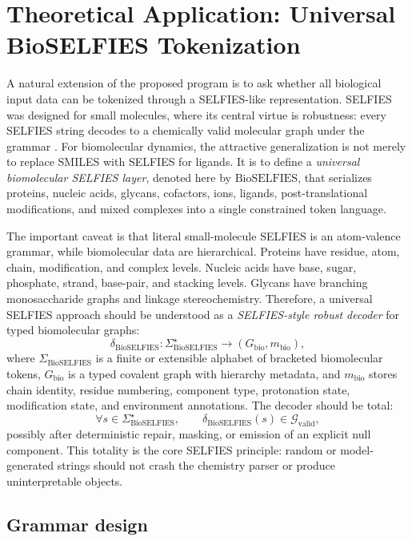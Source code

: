 \documentclass[11pt]{article}
\newcommand{\bioselfies}{\mathrm{BioSELFIES}}
\begin{document}
\section{Theoretical Application: Universal BioSELFIES Tokenization}

A natural extension of the proposed program is to ask whether all biological input data can be tokenized through a SELFIES-like representation. SELFIES was designed for small molecules, where its central virtue is robustness: every SELFIES string decodes to a chemically valid molecular graph under the grammar \cite{krenn2020selfies}. For biomolecular dynamics, the attractive generalization is not merely to replace SMILES with SELFIES for ligands. It is to define a \emph{universal biomolecular SELFIES layer}, denoted here by $\bioselfies$, that serializes proteins, nucleic acids, glycans, cofactors, ions, ligands, post-translational modifications, and mixed complexes into a single constrained token language.

The important caveat is that literal small-molecule SELFIES is an atom-valence grammar, while biomolecular data are hierarchical. Proteins have residue, atom, chain, modification, and complex levels. Nucleic acids have base, sugar, phosphate, strand, base-pair, and stacking levels. Glycans have branching monosaccharide graphs and linkage stereochemistry. Therefore, a universal SELFIES approach should be understood as a \emph{SELFIES-style robust decoder} for typed biomolecular graphs:
\[
\delta_{\bioselfies}:\Sigma_{\bioselfies}^\star\to
\left(G_{\mathrm{bio}},m_{\mathrm{bio}}\right),
\]
where $\Sigma_{\bioselfies}$ is a finite or extensible alphabet of bracketed biomolecular tokens, $G_{\mathrm{bio}}$ is a typed covalent graph with hierarchy metadata, and $m_{\mathrm{bio}}$ stores chain identity, residue numbering, component type, protonation state, modification state, and environment annotations. The decoder should be total:
\[
\forall s\in \Sigma_{\bioselfies}^\star,\qquad
\delta_{\bioselfies}(s)\in \mathcal{G}_{\mathrm{valid}},
\]
possibly after deterministic repair, masking, or emission of an explicit null component. This totality is the core SELFIES principle: random or model-generated strings should not crash the chemistry parser or produce uninterpretable objects.

\subsection{Grammar design}
\end{document}
